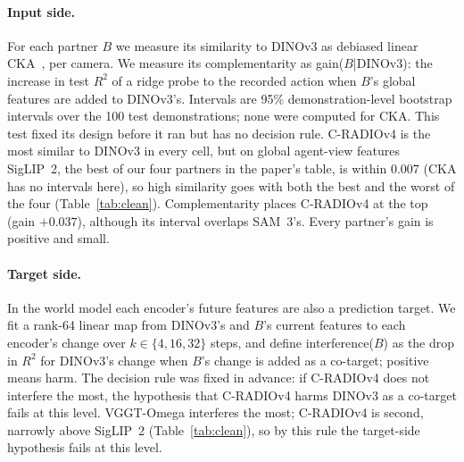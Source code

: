 \paragraph{Input side.}
For each partner $B$ we measure its similarity to DINOv3 as debiased linear CKA~, per camera.
We measure its complementarity as gain($B$|DINOv3): the increase in test $R^2$ of a ridge probe to the recorded action when $B$'s global features are added to DINOv3's.
Intervals are 95\% demonstration-level bootstrap intervals over the 100 test demonstrations; none were computed for CKA.
This test fixed its design before it ran but has no decision rule.
C-RADIOv4 is the most similar to DINOv3 in every cell, but on global agent-view features SigLIP~2, the best of our four partners in the paper's table, is within 0.007 (CKA has no intervals here), so high similarity goes with both the best and the worst of the four (Table~\ref{tab:clean}).
Complementarity places C-RADIOv4 at the top (gain $+0.037$), although its interval overlaps SAM~3's.
Every partner's gain is positive and small.

\paragraph{Target side.}
In the world model each encoder's future features are also a prediction target.
We fit a rank-64 linear map from DINOv3's and $B$'s current features to each encoder's change over $k\in\{4,16,32\}$ steps, and define interference($B$) as the drop in $R^2$ for DINOv3's change when $B$'s change is added as a co-target; positive means harm.
The decision rule was fixed in advance: if C-RADIOv4 does not interfere the most, the hypothesis that C-RADIOv4 harms DINOv3 as a co-target fails at this level.
VGGT-Omega interferes the most; C-RADIOv4 is second, narrowly above SigLIP~2 (Table~\ref{tab:clean}), so by this rule the target-side hypothesis fails at this level.

